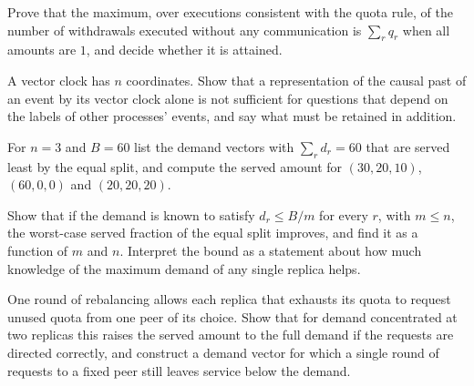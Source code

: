 \begin{exercise}
Prove that the maximum, over executions consistent with the quota rule, of the number of withdrawals executed without any communication is $\sum_rq_r$ when all amounts are $1$, and decide whether it is attained.
\end{exercise}

\begin{exercise}
A vector clock has $n$ coordinates. Show that a representation of the causal past of an event by its vector clock alone is not sufficient for questions that depend on the labels of other processes' events, and say what must be retained in addition.
\end{exercise}


\begin{exercise}
For $n=3$ and $B=60$ list the demand vectors with $\sum_rd_r=60$ that are served least by the equal split, and compute the served amount for $(30,20,10)$, $(60,0,0)$ and $(20,20,20)$.\label{ex:equal-split}
\end{exercise}

\begin{exercise}
Show that if the demand is known to satisfy $d_r\le B/m$ for every $r$, with $m\le n$, the worst-case served fraction of the equal split improves, and find it as a function of $m$ and $n$. Interpret the bound as a statement about how much knowledge of the maximum demand of any single replica helps.\label{ex:bounded-demand}
\end{exercise}

\begin{exercise}
One round of rebalancing allows each replica that exhausts its quota to request unused quota from one peer of its choice. Show that for demand concentrated at two replicas this raises the served amount to the full demand if the requests are directed correctly, and construct a demand vector for which a single round of requests to a fixed peer still leaves service below the demand.
\end{exercise}

